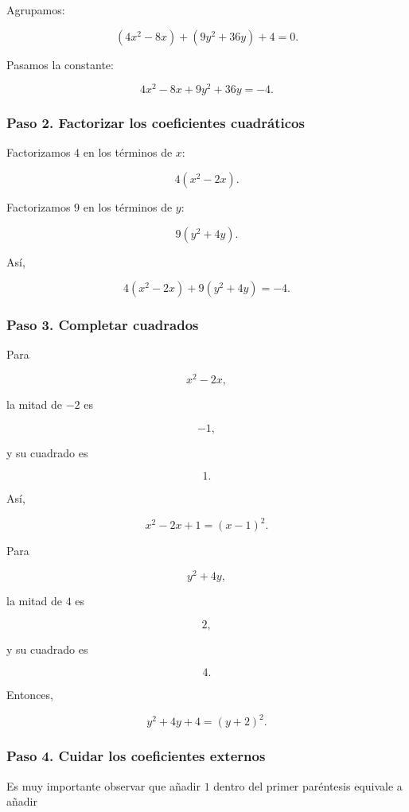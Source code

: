 \documentclass[12pt]{article}
\begin{document}
{Agrupamos:

\[
(4x^2-8x)+(9y^2+36y)+4=0.
\]

Pasamos la constante:

\[
4x^2-8x+9y^2+36y=-4.
\]

\subsubsection*{Paso 2. Factorizar los coeficientes cuadráticos}

Factorizamos \(4\) en los términos de \(x\):

\[
4(x^2-2x).
\]

Factorizamos \(9\) en los términos de \(y\):

\[
9(y^2+4y).
\]

Así,

\[
4(x^2-2x)+9(y^2+4y)=-4.
\]

\subsubsection*{Paso 3. Completar cuadrados}

Para

\[
x^2-2x,
\]

la mitad de \(-2\) es

\[
-1,
\]

y su cuadrado es

\[
1.
\]

Así,

\[
x^2-2x+1=(x-1)^2.
\]

Para

\[
y^2+4y,
\]

la mitad de \(4\) es

\[
2,
\]

y su cuadrado es

\[
4.
\]

Entonces,

\[
y^2+4y+4=(y+2)^2.
\]

\subsubsection*{Paso 4. Cuidar los coeficientes externos}

Es muy importante observar que añadir \(1\) dentro del primer
paréntesis equivale a añadir

}
\end{document}
